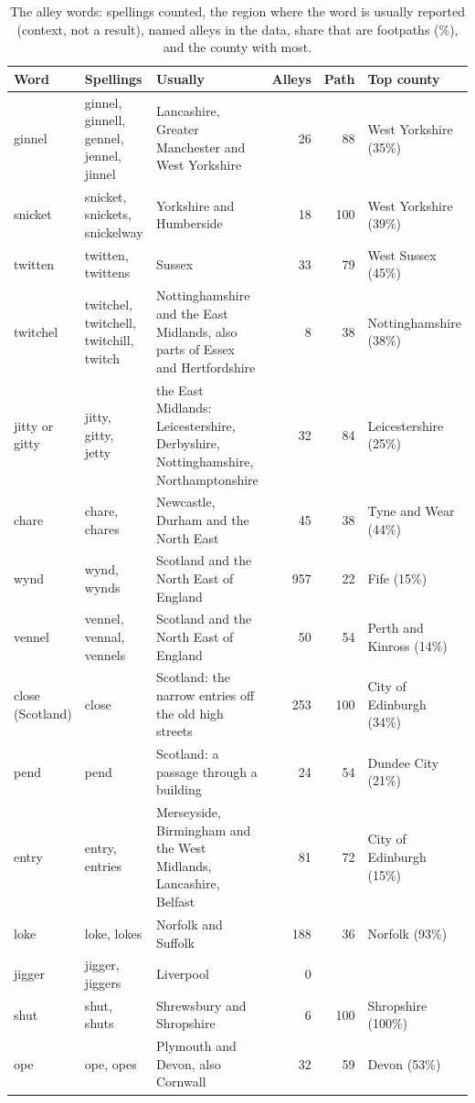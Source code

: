 \documentclass[11pt,a4paper]{article}
\begin{document}
\begin{small}\begin{longtable}{p{2.0cm}p{2.9cm}p{4.1cm}rrp{3.1cm}}\caption{The alley words: spellings counted, the region where the word is usually reported (context, not a result), named alleys in the data, share that are footpaths (\%), and the county with most.}\label{tab:words}\\\toprule Word & Spellings & Usually & Alleys & Path & Top county\\\midrule\endhead
ginnel & ginnel, ginnell, gennel, jennel, jinnel & Lancashire, Greater Manchester and West Yorkshire & 26 & 88 & West Yorkshire (35\%)\\
snicket & snicket, snickets, snickelway & Yorkshire and Humberside & 18 & 100 & West Yorkshire (39\%)\\
twitten & twitten, twittens & Sussex & 33 & 79 & West Sussex (45\%)\\
twitchel & twitchel, twitchell, twitchill, twitch & Nottinghamshire and the East Midlands, also parts of Essex and Hertfordshire & 8 & 38 & Nottinghamshire (38\%)\\
jitty or gitty & jitty, gitty, jetty & the East Midlands: Leicestershire, Derbyshire, Nottinghamshire, Northamptonshire & 32 & 84 & Leicestershire (25\%)\\
chare & chare, chares & Newcastle, Durham and the North East & 45 & 38 & Tyne and Wear (44\%)\\
wynd & wynd, wynds & Scotland and the North East of England & 957 & 22 & Fife (15\%)\\
vennel & vennel, vennal, vennels & Scotland and the North East of England & 50 & 54 & Perth and Kinross (14\%)\\
close (Scotland) & close & Scotland: the narrow entries off the old high streets & 253 & 100 & City of Edinburgh (34\%)\\
pend & pend & Scotland: a passage through a building & 24 & 54 & Dundee City (21\%)\\
entry & entry, entries & Merseyside, Birmingham and the West Midlands, Lancashire, Belfast & 81 & 72 & City of Edinburgh (15\%)\\
loke & loke, lokes & Norfolk and Suffolk & 188 & 36 & Norfolk (93\%)\\
jigger & jigger, jiggers & Liverpool & 0 & & \\
shut & shut, shuts & Shrewsbury and Shropshire & 6 & 100 & Shropshire (100\%)\\
ope & ope, opes & Plymouth and Devon, also Cornwall & 32 & 59 & Devon (53\%)\\

\end{longtable}
\end{small}
\end{document}
